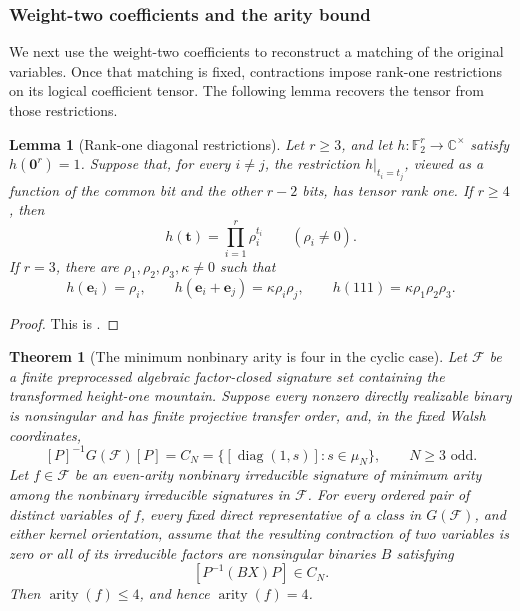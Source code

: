 \documentclass[11pt,letterpaper,onecolumn]{article}
\theoremstyle{plain}
\newtheorem{theorem}{Theorem}[section]
\newtheorem{lemma}[lemma]{Lemma}
\theoremstyle{definition}
\theoremstyle{remark}
\newcommand{\Ftwo}{\mathbb F_2}
\newcommand{\cF}{\mathcal F}
\newcommand{\diag}{\operatorname{diag}}
\newcommand{\arity}{\operatorname{arity}}
\newcommand{\zero}{\mathbf 0}
\begin{document}
	\subsubsection{Weight-two coefficients and the arity bound}
	\label{subsec:odd-cyc-weight-two}
	
	We next use the weight-two coefficients to reconstruct a matching of
	the original variables. Once that matching is fixed, contractions impose
	rank-one restrictions on its logical coefficient tensor. The following lemma
	recovers the tensor from those restrictions.

	\begin{lemma}[Rank-one diagonal restrictions]
		\label{lem:diagonal-slice-integration}
		Let \(r\ge3\), and let \(h:\Ftwo^r\to\mathbb C^\times\) satisfy
		\(h(\zero^r)=1\).  Suppose that, for every \(i\ne j\), the restriction
		\(h|_{t_i=t_j}\), viewed as a function of the common bit and the other
		\(r-2\) bits, has tensor rank one.  If \(r\ge4\), then
		\[
		h({\mathbf t})=\prod_{i=1}^r\rho_i^{t_i}
		\qquad(\rho_i\ne0).
		\]
		If \(r=3\), there are \(\rho_1,\rho_2,\rho_3,\kappa\ne0\) such that
		\begin{equation}
			h({\mathbf e}_i)=\rho_i,\qquad
			h({\mathbf e}_i+{\mathbf e}_j)=\kappa\rho_i\rho_j,\qquad
			h(111)=\kappa\rho_1\rho_2\rho_3.
			\label{eq:diagonal-slice-q3-table}
		\end{equation}
	\end{lemma}
	
	\begin{proof}
		This is \cite[Lemma~7.8]{Liu2026DEQ2Holant}.
	\end{proof}
	
	\begin{theorem}[The minimum nonbinary arity is four in the cyclic case]
		\label{thm:odd-cyc-higher-collapse}
		Let \(\cF\) be a finite preprocessed algebraic factor-closed signature
		set containing the transformed height-one mountain.  Suppose every nonzero
		directly realizable binary is nonsingular and has finite projective transfer
		order, and, in the fixed
		Walsh coordinates,
		\[
		[P]^{-1}G(\cF)[P]
		=C_N=\{[\diag(1,s)]:s\in\mu_N\},
		\qquad N\ge3\text{ odd}.
		\]
		Let \(f\in\cF\) be an even-arity nonbinary irreducible signature of
		minimum arity among the nonbinary irreducible signatures in \(\cF\).
		For every ordered pair of distinct variables of \(f\), every fixed direct
		representative of a class in \(G(\cF)\), and either kernel orientation,
		assume that the resulting contraction of two variables is zero or all of its irreducible factors are nonsingular binaries \(B\) satisfying
		\[
		[P^{-1}(BX)P]\in C_N.
		\]
		Then \(\arity(f)\le4\), and hence \(\arity(f)=4\).
	\end{theorem}
	
\end{document}
